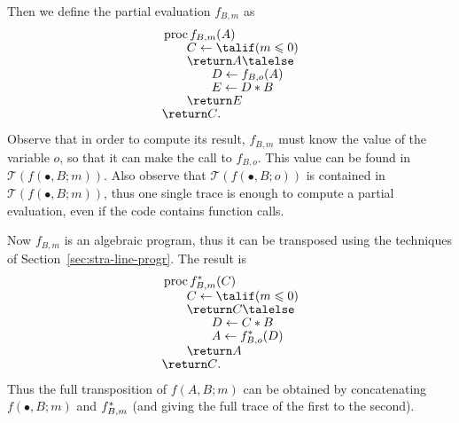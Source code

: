Then we define the partial evaluation $f_{B,m}$ as 
\begin{equation}
  \begin{aligned}
    &\proc f_{B,m}(A)\\[-1ex]
    &\qquad C \la \talif (m\le 0)\\[-1ex]
    &\qquad \return A \talelse\\[-1ex]
    &\qquad\qquad D \la f_{B,o}(A)\\[-1ex]
    &\qquad\qquad E \la D * B\\[-1ex]
    &\qquad \return E\\[-1ex]
    &\return C\text{.}
  \end{aligned}
\end{equation}
Observe that in order to compute its result, $f_{B,m}$ must know the
value of the variable $o$, so that it can make the call to
$f_{B,o}$. This value can be found in
$\mathcal{T}(f(\bullet,B;m))$. Also observe that
$\mathcal{T}(f(\bullet,B;o))$ is contained in
$\mathcal{T}(f(\bullet,B;m))$, thus one single trace is enough to
compute a partial evaluation, even if the code contains function
calls.

Now $f_{B,m}$ is an algebraic program, thus it can be transposed using
the techniques of Section~\ref{sec:stra-line-progr}. The result is
\begin{equation}
  \begin{aligned}
    &\proc \dual{f}_{B,m}(C)\\[-1ex]
    &\qquad C \la \talif (m\le 0)\\[-1ex]
    &\qquad \return C \talelse\\[-1ex]
    &\qquad\qquad D \la C * B\\[-1ex]
    &\qquad\qquad A \la \dual{f}_{B,o}(D)\\[-1ex]
    &\qquad \return A\\[-1ex]
    &\return C\text{.}
  \end{aligned}
\end{equation}
Thus the full transposition of $f(A,B;m)$ can be obtained by
concatenating $f(\bullet,B;m)$ and $f^\ast_{B,m}$ (and giving the
full trace of the first to the second).




%

